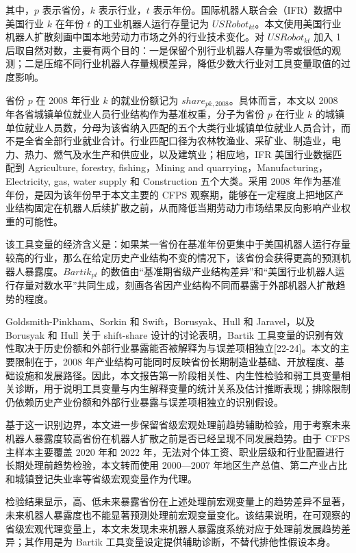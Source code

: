 \documentclass[UTF8, zihao=-4, a4paper, openany, fontset=none]{ctexrep}
\numberwithin{equation}{chapter}
\begin{document}
其中，\(p\) 表示省份，\(k\) 表示行业，\(t\) 表示年份。国际机器人联合会（IFR）数据中美国行业 \(k\) 在年份 \(t\) 的工业机器人运行存量记为 \(USRobot_{kt}\)。本文使用美国行业机器人扩散刻画中国本地劳动力市场之外的行业技术变化。对 \(USRobot_{kt}\) 加入 1 后取自然对数，主要有两个目的：一是保留个别行业机器人存量为零或很低的观测；二是压缩不同行业机器人存量规模差异，降低少数大行业对工具变量取值的过度影响。

省份 \(p\) 在 2008 年行业 \(k\) 的就业份额记为 \(share_{pk,2008}\)。具体而言，本文以 2008 年各省城镇单位就业人员行业结构作为基准权重，分子为省份 \(p\) 在行业 \(k\) 的城镇单位就业人员数，分母为该省纳入匹配的五个大类行业城镇单位就业人员合计，而不是全省全部行业就业合计。行业匹配口径为农林牧渔业、采矿业、制造业，电力、热力、燃气及水生产和供应业，以及建筑业；相应地，IFR 美国行业数据匹配到 Agriculture, forestry, fishing，Mining and quarrying，Manufacturing，Electricity, gas, water supply 和 Construction 五个大类。采用 2008 年作为基准年份，是因为该年份早于本文主要的 CFPS 观察期，能够在一定程度上把地区产业结构固定在机器人后续扩散之前，从而降低当期劳动力市场结果反向影响产业权重的可能性。

该工具变量的经济含义是：如果某一省份在基准年份更集中于美国机器人运行存量较高的行业，那么在给定历史产业结构不变的情况下，该省份会获得更高的预测机器人暴露度。\(Bartik_{pt}\) 的数值由``基准期省级产业结构差异''和``美国行业机器人运行存量对数水平''共同生成，刻画各省因产业结构不同而暴露于外部机器人扩散趋势的程度。

Goldsmith-Pinkham、Sorkin 和 Swift，Borusyak、Hull 和 Jaravel，以及 Borusyak 和 Hull 关于 shift-share 设计的讨论表明，Bartik 工具变量的识别有效性取决于历史份额和外部行业暴露能否被解释为与误差项相独立{[}22-24{]}。本文的主要限制在于，2008 年产业结构可能同时反映省份长期制造业基础、开放程度、基础设施和发展路径。因此，本文报告第一阶段相关性、内生性检验和弱工具变量相关诊断，用于说明工具变量与内生解释变量的统计关系及估计推断表现；排除限制仍依赖历史产业份额和外部行业暴露与误差项相独立的识别假设。

基于这一识别边界，本文进一步保留省级宏观处理前趋势辅助检验，用于考察未来机器人暴露度较高省份在机器人扩散之前是否已经呈现不同发展趋势。由于 CFPS 主样本主要覆盖 2020 年和 2022 年，无法对个体工资、职业层级和行业配置进行长期处理前趋势检验，本文转而使用 2000---2007 年地区生产总值、第二产业占比和城镇登记失业率等省级宏观变量作为代理。

检验结果显示，高、低未来暴露省份在上述处理前宏观变量上的趋势差异不显著，未来机器人暴露度也不能显著预测处理前宏观变量变化。该结果说明，在可观察的省级宏观代理变量上，本文未发现未来机器人暴露度系统对应于处理前发展趋势差异；其作用是为 Bartik 工具变量设定提供辅助诊断，不替代排他性假设本身。
\end{document}
